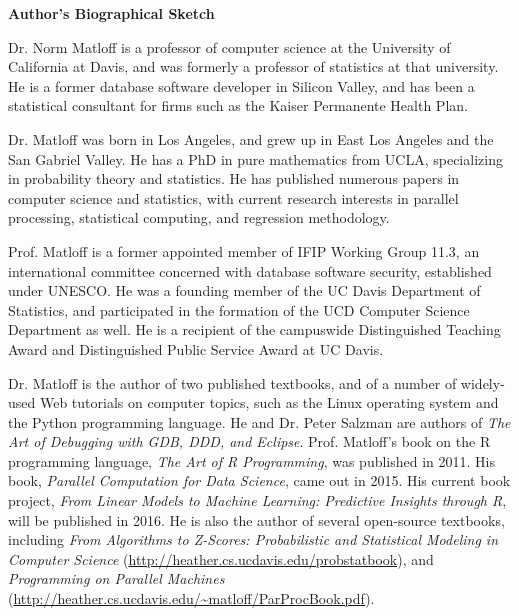 \begin{center}
{\bf Author's Biographical Sketch}
\end{center} 

Dr. Norm Matloff is a professor of computer science at the University of
California at Davis, and was formerly a professor of statistics at that
university. He is a former database software developer in Silicon
Valley, and has been a statistical consultant for firms such as the
Kaiser Permanente Health Plan.

Dr. Matloff was born in Los Angeles, and grew up in East Los Angeles and
the San Gabriel Valley. He has a PhD in pure mathematics from UCLA,
specializing in probability theory and statistics.  He has published
numerous papers in computer science and statistics, with current
research interests in parallel processing, statistical computing,
and regression methodology.

Prof. Matloff is a former appointed member of IFIP Working Group 11.3,
an international committee concerned with database software security,
established under UNESCO.  He was a founding member of the UC Davis
Department of Statistics, and participated in the formation of the UCD
Computer Science Department as well.  He is a recipient of the
campuswide Distinguished Teaching Award and Distinguished Public Service
Award at UC Davis.

Dr. Matloff is the author of two published textbooks, and of a number of
widely-used Web tutorials on computer topics, such as the Linux
operating system and the Python programming language.  He and Dr. Peter
Salzman are authors of {\it The Art of Debugging with GDB, DDD, and
Eclipse}. Prof.  Matloff's book on the R programming language, {\it The
Art of R Programming}, was published in 2011.  His book, {\it Parallel
Computation for Data Science}, came out in 2015.  His current book
project, {\it From Linear Models to Machine Learning: Predictive
Insights through R}, will be published in 2016.  He is also the author
of several open-source textbooks, including {\it From Algorithms to
Z-Scores: Probabilistic and Statistical Modeling in Computer Science}
(\url{http://heather.cs.ucdavis.edu/probstatbook}), and {\it Programming
on Parallel Machines}
(\url{http://heather.cs.ucdavis.edu/~matloff/ParProcBook.pdf}).
